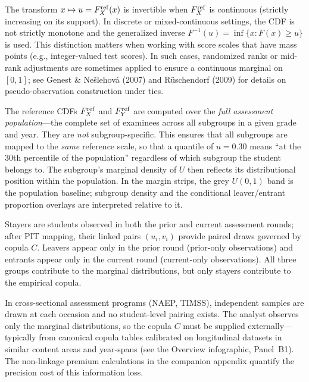 \documentclass[10pt]{article}
\newlength{\fnlabelwidth}
\newcommand{\fnline}[2]{%
  \par\noindent
  \makebox[\fnlabelwidth][l]{$^{#1}$}%
  \parbox[t]{\dimexpr\linewidth-\fnlabelwidth\relax}{#2}%
  \par
}
\begin{document}
\noindent
\hspace{0.45in}%
\begin{minipage}[t]{7.5in}
\footnotesize\raggedright
\setlength{\parskip}{0pt}

\fnline{1}{The transform $x \mapsto u = F_X^{\mathrm{ref}}(x)$ is invertible when $F_X^{\mathrm{ref}}$
is continuous (strictly increasing on its support). In discrete or
mixed-continuous settings, the CDF is not strictly monotone and the
generalized inverse $F^{-1}(u) = \inf\{x : F(x) \ge u\}$ is used.
This distinction matters when working with score scales that have mass
points (e.g., integer-valued test scores). In such cases, randomized
ranks or mid-rank adjustments are sometimes applied to ensure a
continuous marginal on $[0,1]$; see Genest \& Ne\v{s}lehov\'{a} (2007)
and R\"{u}schendorf (2009) for details on pseudo-observation
construction under ties.}

\vspace{4pt}
\fnline{2}{The reference CDFs $F_X^{\mathrm{ref}}$ and $F_Y^{\mathrm{ref}}$ are computed over the
\emph{full assessment population}---the complete set of examinees
across all subgroups in a given grade and year. They are \emph{not}
subgroup-specific. This ensures that all subgroups are mapped to
the \emph{same} reference scale, so that a quantile of $u = 0.30$
means ``at the 30th percentile of the population'' regardless of
which subgroup the student belongs to. The subgroup's marginal
density of $U$ then reflects its distributional position within
the population. In the margin strips, the grey $U(0,1)$ band is
the population baseline; subgroup density and the conditional
leaver/entrant proportion overlays are interpreted relative to it.}

\vspace{4pt}
\fnline{3}{Stayers are students observed in both the prior and current
assessment rounds; after PIT mapping, their linked pairs $(u_i, v_i)$
provide paired draws governed by copula $C$. Leavers appear only
in the prior round (prior-only observations) and entrants appear only
in the current round (current-only observations). All three groups
contribute to the marginal distributions, but only stayers contribute
to the empirical copula.}

\vspace{4pt}
\fnline{4}{In cross-sectional assessment programs (NAEP, TIMSS),
independent samples are drawn at each occasion and no student-level
pairing exists. The analyst observes only the marginal distributions,
so the copula $C$ must be supplied externally---typically from
canonical copula tables calibrated on longitudinal datasets in
similar content areas and year-spans (see the Overview infographic,
Panel~B1). The non-linkage premium calculations in the companion
appendix quantify the precision cost of this information loss.}

\end{minipage}
\end{document}

